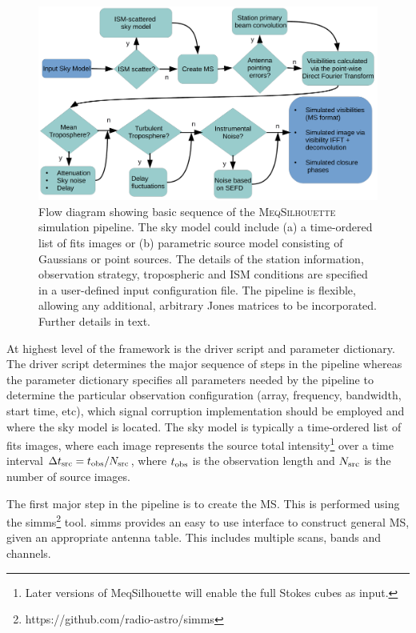 \begin{figure}
\begin{center}
\includegraphics[width=\columnwidth]{Images/flow_full}
\caption{Flow diagram showing basic sequence of the \textsc{MeqSilhouette} simulation pipeline. The sky model could include (a) a time-ordered list of {\sc fits} images or (b) parametric source model consisting of Gaussians or point sources. The details of the station information, observation strategy, tropospheric and ISM conditions are specified in a user-defined input configuration file. The pipeline is flexible, allowing any additional, arbitrary Jones matrices to be incorporated. Further details in text.\label{flow}%
}
\end{center}
\end{figure}


At highest level of the framework is the driver script and parameter dictionary. The driver script determines the major sequence of steps in the pipeline whereas the parameter dictionary specifies all parameters needed by the pipeline to determine the particular observation configuration (array, frequency, bandwidth, start time, etc), which signal corruption implementation should be employed and where the sky model is located. The sky model is typically a time-ordered list of {\sc fits} images, where each image represents the source total intensity\footnote{Later versions of {\sc MeqSilhouette} will enable the full Stokes cubes as input.} over a time interval $\Delta t_{\rm src} = t_{\rm obs}/N_{\rm src}$, where $t_{\rm obs}$ is the observation length and $N_{\rm src}$ is the number of source images.


The first major step in the pipeline is to create the MS. This is performed using the {\sc simms}\footnote{https://github.com/radio-astro/simms} tool. {\sc simms} provides an easy to use interface to construct general MS, given an appropriate antenna table. This includes multiple scans, bands and channels. 



